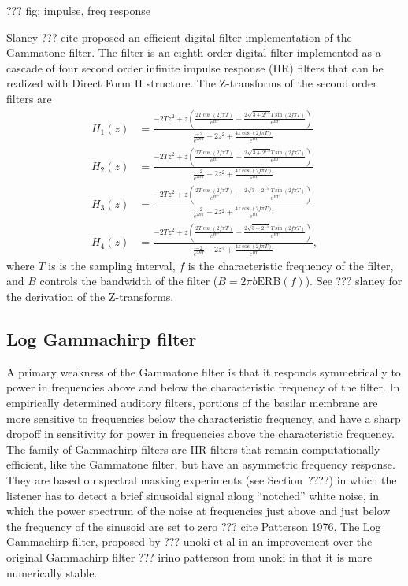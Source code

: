 ??? fig: impulse, freq response

Slaney ??? cite proposed an efficient
digital filter implementation
of the Gammatone filter.
The filter is an eighth order
digital filter
implemented as a cascade of four
second order infinite impulse response (IIR) filters
that can be realized
with Direct Form II structure.
The Z-transforms of the
second order filters are
\begin{align*}
  H_1(z) &= \frac{-2 T z^2 + z \left(
            \frac{2 T \cos(2 f \pi T)}{e^{BT}}
            + \frac{2 \sqrt{3 + 2^{1.5}} T \sin(2 f \pi T)}{e^{BT}}
           \right)}
           {\frac{-2}{e^{2BT}} - 2 z^2
           + \frac{4 z \cos(2 f \pi T)}{e^{BT}}} \\
  H_2(z) &= \frac{-2 T z^2 + z \left(
            \frac{2 T \cos(2 f \pi T)}{e^{BT}}
            - \frac{2 \sqrt{3 + 2^{1.5}} T \sin(2 f \pi T)}{e^{BT}}
           \right)}
           {\frac{-2}{e^{2BT}} - 2 z^2
           + \frac{4 z \cos(2 f \pi T)}{e^{BT}}} \\
  H_3(z) &= \frac{-2 T z^2 + z \left(
            \frac{2 T \cos(2 f \pi T)}{e^{BT}}
            + \frac{2 \sqrt{3 - 2^{1.5}} T \sin(2 f \pi T)}{e^{BT}}
           \right)}
           {\frac{-2}{e^{2BT}} - 2 z^2
           + \frac{4 z \cos(2 f \pi T)}{e^{BT}}} \\
  H_4(z) &= \frac{-2 T z^2 + z \left(
            \frac{2 T \cos(2 f \pi T)}{e^{BT}}
            - \frac{2 \sqrt{3 - 2^{1.5}} T \sin(2 f \pi T)}{e^{BT}}
           \right)}
           {\frac{-2}{e^{2BT}} - 2 z^2
           + \frac{4 z \cos(2 f \pi T)}{e^{BT}}},
\end{align*}
where $T$ is is the sampling interval,
$f$ is the characteristic frequency of the filter,
and $B$ controls the bandwidth of the filter
($B = 2 \pi b \text{ERB}(f)$).
See ??? slaney for the derivation
of the Z-transforms.

\subsection{Log Gammachirp filter}

A primary weakness of the Gammatone filter
is that it responds symmetrically
to power in frequencies above and below
the characteristic frequency of the filter.
In empirically determined auditory filters,
portions of the basilar membrane
are more sensitive to frequencies
below the characteristic frequency,
and have a sharp dropoff in sensitivity
for power in frequencies
above the characteristic frequency.
The family of Gammachirp filters
are IIR filters that remain
computationally efficient,
like the Gammatone filter,
but have an asymmetric frequency response.
They are based on spectral masking experiments
(see Section~????)
in which the listener has to
detect a brief sinusoidal signal
along ``notched'' white noise,
in which the power spectrum of the noise
at frequencies just above and just below
the frequency of the sinusoid
are set to zero ??? cite Patterson 1976.
The Log Gammachirp filter,
proposed by ??? unoki et al
in an improvement over
the original Gammachirp filter
??? irino patterson from unoki
in that it is more numerically stable.

